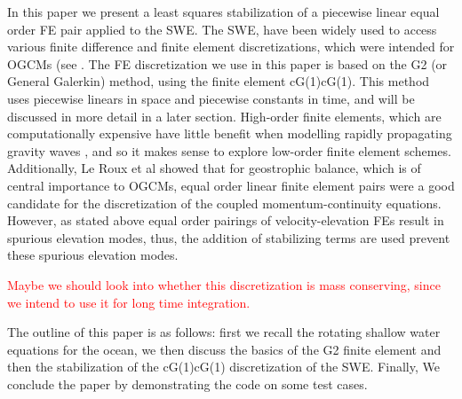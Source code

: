 In this paper we present a least squares stabilization of a piecewise linear
equal order FE pair applied to the SWE. The SWE, have been widely used to access
various finite difference and finite element discretizations, which were
intended for OGCMs (see \cite{Batteen1981,Hanert2004,Le-Roux1998,Walters1984}.
The FE discretization we use in this paper is based on the G2 (or General
Galerkin) method, using the finite element cG(1)cG(1). This method uses
piecewise linears in space and piecewise constants in time, and will be
discussed in more detail in a later section. High-order finite elements, which
are computationally expensive have little benefit when modelling rapidly
propagating gravity waves \cite{Le-Roux1998}, and so it makes sense to explore
low-order finite element schemes. Additionally, Le Roux et al \cite{Le-Roux1998}
showed that for geostrophic balance, which is of central importance to OGCMs,
equal order linear finite element pairs were a good candidate for the
discretization of the coupled momentum-continuity equations. However, as stated
above equal order pairings of velocity-elevation FEs result in spurious
elevation modes, thus, the addition of stabilizing terms are used prevent these
spurious elevation modes. 

\textcolor{red}{Maybe we should look into whether this discretization is mass
conserving, since we intend to use it for long time integration.}

The outline of this paper is as follows: first we recall the rotating shallow
water equations for the ocean, we then discuss the basics of the G2 finite
element and then the stabilization of the cG(1)cG(1) discretization of the SWE.
Finally, We conclude the paper by demonstrating the code on some test cases.
